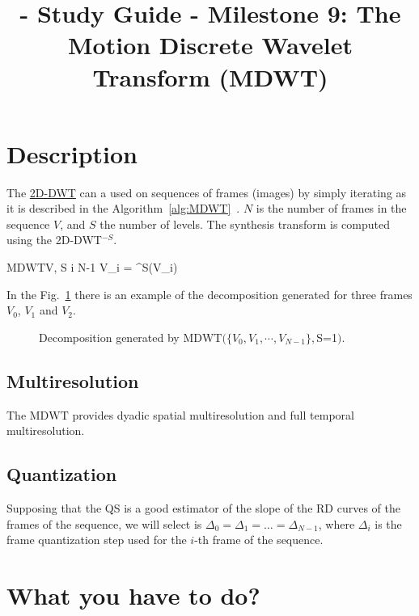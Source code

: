
\title{\SM{} - Study Guide - Milestone 9: The Motion Discrete Wavelet Transform (MDWT)}

\maketitle

\section{Description}

The
\href{https://sistemas-multimedia.github.io/study_guide/06-2D-DWT/}{2D-DWT}
can a used on sequences of frames (images) by simply iterating as it
is described in the
Algorithm~\ref{alg:MDWT}~\cite{taubman2002jpeg2000}. $N$ is the number
of frames in the sequence $V$, and $S$ the number of levels. The
synthesis transform is computed using the 2D-DWT$^{-S}$.

\begin{pseudocode}{$\text{MDWT}$}{V, S}
  \label{alg:MDWT}
  \FOR i  \TO N-1 \DO
  V_i = ^S(V_i)
\end{pseudocode}

In the Fig.~\ref{fig:MDWT} there is an example of the decomposition
generated for three frames $V_0$, $V_1$ and $V_2$.

\begin{figure}
  \centering
  \caption{Decomposition generated by $\text{MDWT}(\{V_0, V_1, \cdots, V_{N-1}\}, $S=1$)$.}
  \label{fig:MDWT}
\end{figure}

\subsection{Multiresolution}
The $\text{MDWT}$ provides dyadic spatial multiresolution and full
temporal multiresolution.

\subsection{Quantization}
Supposing that the QS is a good estimator of the slope of the RD
curves of the frames of the sequence, we will select is
$\Delta_0=\Delta_1=\dots=\Delta_{N-1}$, where $\Delta_i$ is the frame
quantization step used for the $i$-th frame of the sequence.

\section{What you have to do?}

